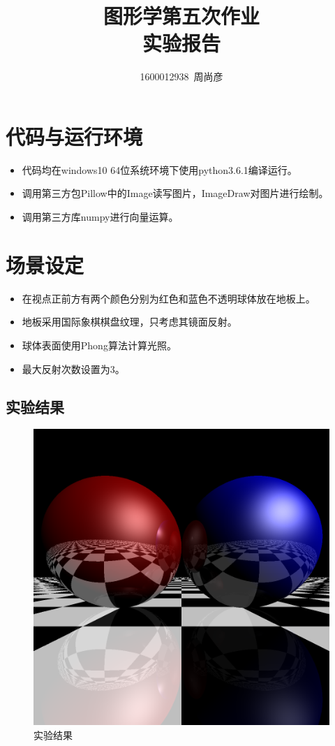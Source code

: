 \documentclass[11pt,UTF8]{article}
\title{\fontsize{25pt}{\baselineskip}\textbf{图形学第五次作业\\[2ex]实验报告}}
\author{1600012938~周尚彦}
\begin{document}
\thispagestyle{plain}

\maketitle

\tableofcontents

\setcounter{section}{0}

\section{代码与运行环境}
	\begin{itemize}
		\item 代码均在windows10 64位系统环境下使用python3.6.1编译运行。
		\item 调用第三方包Pillow中的Image读写图片，ImageDraw对图片进行绘制。
		\item 调用第三方库numpy进行向量运算。
	\end{itemize}

\section{场景设定}
	\begin{itemize}
		\item 在视点正前方有两个颜色分别为红色和蓝色不透明球体放在地板上。
		\item 地板采用国际象棋棋盘纹理，只考虑其镜面反射。
		\item 球体表面使用Phong算法计算光照。
		\item 最大反射次数设置为3。
	\end{itemize}
\newpage

\subsection{实验结果}
	\begin{figure}[H]
		\centering
		\includegraphics[width=\textwidth]{result.BMP}
		\caption{实验结果}\label{results}
	\end{figure}

\newpage
\end{document}
